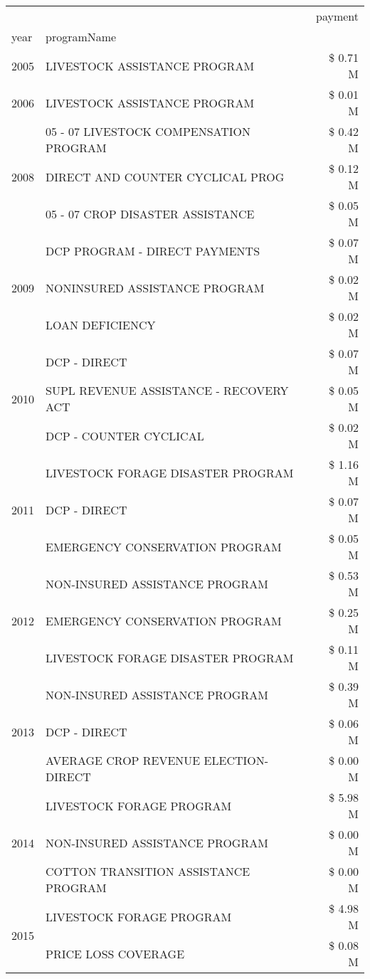 \begin{tabular}{llr}
\toprule
 &  & payment \\
year & programName &  \\
\midrule
2005 & LIVESTOCK ASSISTANCE PROGRAM & \$ 0.71 M \\
\cline{1-3}
2006 & LIVESTOCK ASSISTANCE PROGRAM & \$ 0.01 M \\
\cline{1-3}
\multirow[t]{3}{*}{2008} & 05 - 07 LIVESTOCK COMPENSATION PROGRAM & \$ 0.42 M \\
 & DIRECT AND COUNTER CYCLICAL PROG & \$ 0.12 M \\
 & 05 - 07 CROP DISASTER ASSISTANCE & \$ 0.05 M \\
\cline{1-3}
\multirow[t]{3}{*}{2009} & DCP PROGRAM - DIRECT PAYMENTS & \$ 0.07 M \\
 & NONINSURED ASSISTANCE PROGRAM & \$ 0.02 M \\
 & LOAN DEFICIENCY & \$ 0.02 M \\
\cline{1-3}
\multirow[t]{3}{*}{2010} & DCP - DIRECT & \$ 0.07 M \\
 & SUPL REVENUE ASSISTANCE - RECOVERY ACT & \$ 0.05 M \\
 & DCP - COUNTER CYCLICAL & \$ 0.02 M \\
\cline{1-3}
\multirow[t]{3}{*}{2011} & LIVESTOCK FORAGE DISASTER PROGRAM & \$ 1.16 M \\
 & DCP - DIRECT & \$ 0.07 M \\
 & EMERGENCY CONSERVATION PROGRAM & \$ 0.05 M \\
\cline{1-3}
\multirow[t]{3}{*}{2012} & NON-INSURED ASSISTANCE PROGRAM & \$ 0.53 M \\
 & EMERGENCY CONSERVATION PROGRAM & \$ 0.25 M \\
 & LIVESTOCK FORAGE DISASTER PROGRAM & \$ 0.11 M \\
\cline{1-3}
\multirow[t]{3}{*}{2013} & NON-INSURED ASSISTANCE PROGRAM & \$ 0.39 M \\
 & DCP - DIRECT & \$ 0.06 M \\
 & AVERAGE CROP REVENUE ELECTION-DIRECT & \$ 0.00 M \\
\cline{1-3}
\multirow[t]{3}{*}{2014} & LIVESTOCK FORAGE PROGRAM & \$ 5.98 M \\
 & NON-INSURED ASSISTANCE PROGRAM & \$ 0.00 M \\
 & COTTON TRANSITION ASSISTANCE PROGRAM & \$ 0.00 M \\
\cline{1-3}
\multirow[t]{3}{*}{2015} & LIVESTOCK FORAGE PROGRAM & \$ 4.98 M \\
 & PRICE LOSS COVERAGE & \$ 0.08 M \\

\end{tabular}
